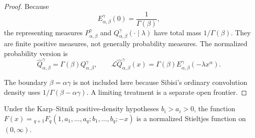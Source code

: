 \begin{proof}
Because
\[
E^\gamma_{\alpha,\beta}(0)=\frac1{\Gamma(\beta)},
\]
the representing measures \(P^\gamma_{\alpha,\beta}\) and \(Q^\gamma_{\alpha,\beta}(\cdot\mid\lambda)\) have total mass \(1/\Gamma(\beta)\). They are finite positive measures, not generally probability measures. The normalized probability version is
\[
\widehat Q^\gamma_{\alpha,\beta}=\Gamma(\beta)Q^\gamma_{\alpha,\beta},
\qquad
\mathcal L\widehat Q^\gamma_{\alpha,\beta}(x)
=\Gamma(\beta)E^\gamma_{\alpha,\beta}(-\lambda x^\alpha).
\]

The boundary \(\beta=\alpha\gamma\) is not included here because Sibisi's ordinary convolution density uses \(1/\Gamma(\beta-\alpha\gamma)\). A limiting treatment is a separate open frontier.
\end{proof}

\begin{proposition}
\label{res:ks-lemma1-stieltjes-normal-form}
Under the Karp--Sitnik positive-density hypotheses \(b_i>a_i>0\), the function \(F(x)={}_{q+1}F_q(1,a_1,\ldots,a_q;b_1,\ldots,b_q;-x)\) is a normalized Stieltjes function on \((0,\infty)\).
\end{proposition}

